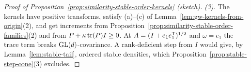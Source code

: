 \begin{proof}[Proof of Proposition~\ref{prop:similarity-stable-order-kernels} (sketch)]
\emph{(3).} The kernels have positive transforms, satisfy (a)--(c) of
Lemma~\ref{lem:gw-kernels-from-origin}(2), and get increments from Proposition~\ref{prop:similarity-stable-order-families}(2) and from
$P + \kappa\operatorname{tr}(P)I \ge 0$. At $A = (I + e_1e_1^{\mathsf{T}})^{1/2}$ and $\omega = e_1$ the trace term breaks
$\mathrm{GL}(d)$-covariance. A
rank-deficient step from $I$ would give, by Lemma~\ref{lem:stable-tail}, ordered stable densities, which
Proposition~\ref{prop:stable-step-cone}(3) excludes.
\end{proof}

